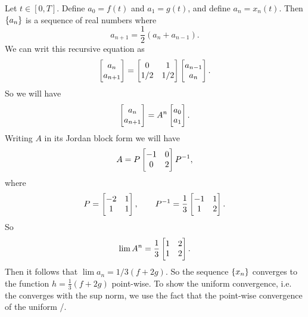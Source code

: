 \begin{solution}
	Let $ t \in [0,T] $. Define $ a_0 = f(t) $ and $ a_1 = g(t) $, and define $ a_n = x_n(t) $. Then $ \{a_n\} $ is a sequence of real numbers where
	\[ a_{n+1} = \frac{1}{2}(a_n + a_{n-1}). \]
	We can writ this recursive equation as
	\[ \begin{bmatrix} a_{n} \\ a_{n+1} \end{bmatrix} = \begin{bmatrix} 0 & 1 \\ 1/2 & 1/2 \end{bmatrix}\begin{bmatrix} a_{n-1} \\ a_n \end{bmatrix}. \]
	So we will have
	\[ \begin{bmatrix} a_n \\ a_{n+1} \end{bmatrix} = A^n\begin{bmatrix} a_0 \\ a_1 \end{bmatrix}. \]
	Writing $ A $ in its Jordan block form we will have
	\[ A = P \begin{bmatrix} -1 & 0 \\ 0 & 2 \end{bmatrix} P^{-1}, \]
	where 
	\[ P = \begin{bmatrix} -2 & 1 \\ 1 & 1 \end{bmatrix}, \qquad P^{-1} = \frac{1}{3}\begin{bmatrix} -1 & 1 \\ 1 & 2 \end{bmatrix}. \]
	So 
	\[ \lim A^n = \frac{1}{3}\begin{bmatrix} 1 & 2 \\ 1 & 2 \end{bmatrix}. \]
	Then it follows that $ \lim a_n = 1/3(f+2g). $ So the sequence $ \{x_n\} $ converges to the function $ h = \frac{1}{3}(f+2g) $ point-wise. To show the uniform convergence, i.e. the converges with the sup norm, we use the fact that the point-wise convergence of the uniform /.
\end{solution}


